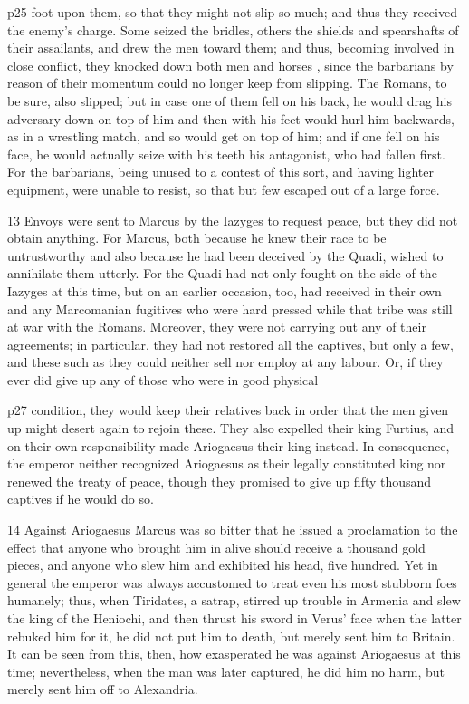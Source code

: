 p25 foot upon them, so that they might not slip so much; and thus they received the enemy's charge. Some seized the bridles, others the shields and spearshafts of their assailants, and drew the men toward them; and thus, becoming involved in close conflict, they knocked down both men and horses , since the barbarians by reason of their momentum could no longer keep from slipping. The Romans, to be sure, also slipped; but in case one of them fell on his back, he would drag his adversary down on top of him and then with his feet would hurl him backwards, as in a wrestling match, and so would get on top of him; and if one fell on his face, he would actually seize with his teeth his antagonist, who had fallen first. For the barbarians, being unused to a contest of this sort, and having lighter equipment, were unable to resist, so that but few escaped out of a large force.

13
Envoys were sent to Marcus by the Iazyges to request peace, but they did not obtain anything. For Marcus, both because he knew their race to be untrustworthy and also because he had been deceived by the Quadi, wished to annihilate them utterly. For the Quadi had not only fought on the side of the Iazyges at this time, but on an earlier occasion, too, had received in their own and any Marcomanian fugitives who were hard pressed while that tribe was still at war with the Romans. Moreover, they were not carrying out any of their agreements; in particular, they had not restored all the captives, but only a few, and these such as they could neither sell nor employ at any labour. Or, if they ever did give up any of those who were in good physical

p27 condition, they would keep their relatives back in order that the men given up might desert again to rejoin these. They also expelled their king Furtius, and on their own responsibility made Ariogaesus their king instead. In consequence, the emperor neither recognized Ariogaesus as their legally constituted king nor renewed the treaty of peace, though they promised to give up fifty thousand captives if he would do so.

14
Against Ariogaesus Marcus was so bitter that he issued a proclamation to the effect that anyone who brought him in alive should receive a thousand gold pieces, and anyone who slew him and exhibited his head, five hundred. Yet in general the emperor was always accustomed to treat even his most stubborn foes humanely; thus, when Tiridates, a satrap, stirred up trouble in Armenia and slew the king of the Heniochi, and then thrust his sword in Verus'\texthebrew{⁠} face when the latter rebuked him for it, he did not put him to death, but merely sent him to Britain. It can be seen from this, then, how exasperated he was against Ariogaesus at this time; nevertheless, when the man was later captured, he did him no harm, but merely sent him off to Alexandria.

